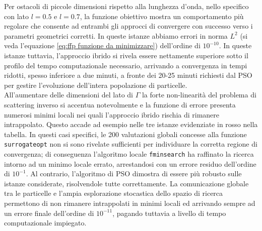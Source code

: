 \documentclass[a4paper,12pt]{article}
\theoremstyle{definition}
\begin{document}
Per ostacoli di piccole dimensioni rispetto alla lunghezza d'onda, nello specifico con lato $l= 0.5$ e $l=0.7$, la funzione obiettivo mostra un comportamento più regolare che consente ad entrambi gli approcci di convergere con successo verso i parametri geometrici corretti. In queste istanze abbiamo errori in norma $L^2$ (si veda l'equazione \ref{eq:ffp funzione da minimizzare}) dell'ordine di $10^{-10}$. In queste istanze tuttavia, l'approccio ibrido si rivela essere nettamente superiore sotto il profilo del tempo computazionale necessario, arrivando a convergenza in tempi ridotti, spesso inferiore a due minuti, a fronte dei 20-25 minuti richiesti dal PSO per gestire l'evoluzione dell'intera popolazione di particelle.\\
All'aumentare delle dimensioni del lato di $\Gamma$ la forte non-linearità del problema di scattering inverso si accentua notevolmente e la funzione di errore presenta numerosi minimi locali nei quali l'approccio ibrido rischia di rimanere intrappolato. Questo accade ad esempio nelle tre istanze evidenziate in rosso nella tabella. In questi casi specifici, le 200 valutazioni globali concesse alla funzione \texttt{surrogateopt} non si sono rivelate sufficienti per individuare la corretta regione di convergenza; di conseguenza l'algoritmo locale \texttt{fminsearch} ha raffinato la ricerca intorno ad un minimo locale errato, arrestandosi con un errore residuo dell'ordine di $10^{-1}$. Al contrario, l'algoritmo di PSO dimostra di essere più robusto sulle istanze considerate, risolvendole tutte correttamente. La comunicazione globale tra le particelle e l'ampia esplorazione stocastica dello spazio di ricerca permettono di non rimanere intrappolati in minimi locali ed arrivando sempre ad un errore finale dell'ordine di $10^{-11}$, pagando tuttavia a livello di tempo computazionale impiegato. 
\end{document}
